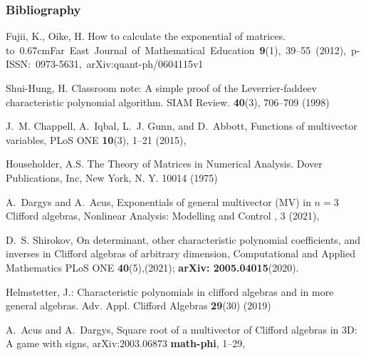 \documentclass[xcolor=table,hyperref={pdfpagemode=FullScreen}]{beamer}
\begin{document}
\begin{frame}
\vspace{-5pt}
\frametitle<presentation>{Bibliography\hfill }
\begin{thebibliography}{}
\tiny

Fujii, K., Oike, H. 
\newblock    How to calculate the exponential of matrices.
    \newblock   \hbox{\hbox to 0.67cm{}Far East Journal of Mathematical Education  \textbf{9}(1),  39--55 (2012), p-ISSN:  0973-5631, arXiv:quant-ph/0604115v1}

Shui-Hung, H. 
\newblock
    Classroom note: A simple proof of the {L}everrier-faddeev
  characteristic polynomial algorithm. 
\newblock    SIAM Review.  \textbf{40}(3),  706--709 (1998)

J.~M. Chappell, A.~Iqbal, L.~J. Gunn, and D.~Abbott,
\newblock Functions of multivector variables,
\newblock PLoS ONE {\bf 10}(3), 1--21 (2015),

Householder, A.S.
\newblock The Theory of Matrices in Numerical Analysis. 
\newblock  Dover Publications, Inc, New York, N. Y. 10014 (1975)


A.~Dargys and A.~Acus,
\newblock Exponentials of general multivector (MV) in $n=3$ {C}lifford
  algebras,
\newblock Nonlinear Analysis: Modelling and Control , 3 (2021),

D.~S. Shirokov,
\newblock On determinant, other characteristic polynomial coefficients, and
  inverses in Clifford algebras of arbitrary dimension,
\newblock Computational and Applied Mathematics  PLoS ONE {\bf 40}(5),(2021);  {\bf arXiv: 2005.04015}(2020).

Helmstetter, J.: 
\newblock Characteristic polynomials in clifford algebras and in more
  general algebras. 
\newblock Adv. Appl. Clifford Algebras  \textbf{29}(30) (2019)

A.~Acus and A.~Dargys,
\newblock Square root of a multivector of {C}lifford algebras in 3{D}: A game
  with signs,
\newblock arXiv:2003.06873 {\bf math-phi}, 1--29,
\end{thebibliography}
\end{frame}
\end{document}
